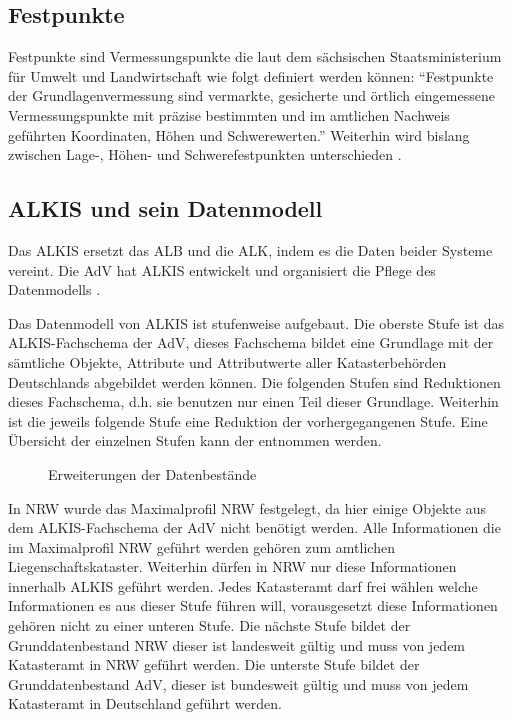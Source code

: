 \subsection{Festpunkte}
Festpunkte sind Vermessungspunkte die laut dem sächsischen Staatsministerium für Umwelt und Landwirtschaft \autocite{sachsen-festpunkt} wie folgt definiert werden können:
\enquote{Festpunkte der Grundlagenvermessung sind vermarkte, gesicherte und örtlich eingemessene Vermessungspunkte mit präzise bestimmten und im amtlichen Nachweis geführten Koordinaten, Höhen und Schwerewerten.} Weiterhin wird bislang zwischen Lage-, Höhen- und Schwerefestpunkten unterschieden \autocite[vgl.][]{adv-festpunkte}.

\subsection{ALKIS und sein Datenmodell}
Das \acf{ALKIS} ersetzt das \acf{ALB} und die \acf{ALK}, indem es die Daten beider Systeme vereint. Die \acs{AdV} hat \acs{ALKIS} entwickelt und organisiert die Pflege des Datenmodells \autocite[vgl.][]{adv-alkis}.

Das Datenmodell von ALKIS ist stufenweise aufgebaut. Die oberste Stufe ist das ALKIS-Fachschema der AdV, dieses Fachschema bildet eine Grundlage mit der sämtliche Objekte, Attribute und Attributwerte aller Katasterbehörden Deutschlands abgebildet werden können.
Die folgenden Stufen sind Reduktionen dieses Fachschema, d.h. sie benutzen nur einen Teil dieser Grundlage. Weiterhin ist die jeweils folgende Stufe eine Reduktion der vorhergegangenen Stufe. Eine Übersicht der einzelnen Stufen kann der  entnommen werden. 

\begin{figure}[htbp]
	\centering
	\caption{Erweiterungen der Datenbestände}
	\label{fig:prod-stufen}
\end{figure}

In \ac{NRW} wurde das Maximalprofil NRW festgelegt, da hier einige Objekte aus dem ALKIS-Fachschema der AdV nicht benötigt werden. Alle Informationen die im Maximalprofil NRW geführt werden gehören zum amtlichen Liegenschaftskataster.
Weiterhin dürfen in NRW nur diese Informationen innerhalb ALKIS geführt werden. Jedes Katasteramt darf frei wählen welche Informationen es aus dieser Stufe führen will, vorausgesetzt diese Informationen gehören nicht zu einer unteren Stufe.
Die nächste Stufe bildet der Grunddatenbestand NRW dieser ist landesweit gültig und muss von jedem Katasteramt in NRW geführt werden.
Die unterste Stufe bildet der Grunddatenbestand AdV, dieser ist bundesweit gültig und muss von jedem Katasteramt in Deutschland geführt werden.

